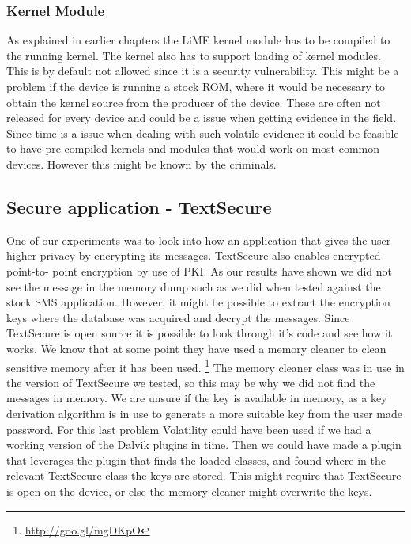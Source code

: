 \subsubsection{Kernel Module}
As explained in earlier chapters the LiME kernel module has to be compiled to the 
running kernel. The kernel also has to support loading of kernel modules. This is 
by default not allowed since it is a security vulnerability. This might be a 
problem if the device is running a stock ROM, where it would be necessary to obtain 
the kernel source from the producer of the device. These are often not released for 
every device and could be a issue when getting evidence in the field. Since time is 
a issue when dealing with such volatile evidence it could be feasible to have 
pre-compiled kernels and modules that would work on most common devices. However 
this might be known by the criminals. %

\subsection{Secure application - TextSecure}
One of our experiments was to look into how an application that gives the user higher 
privacy by encrypting its messages. TextSecure also enables encrypted point-to-
point encryption by use of PKI. As our results have shown we did not see the 
message in the memory dump such as we did when tested against the stock SMS application. 
However, it might be possible to extract the encryption keys where the database was 
acquired and decrypt the messages. Since TextSecure is open source it is
possible to look through it's code and see how it works. We know that at some
point they have used a memory cleaner to clean sensitive memory after it has
been used.
\footnote{\url{http://goo.gl/mgDKpO}} 
The memory cleaner class was in use in the version of TextSecure we tested, so
this may be why we did not find the messages in memory. We are unsure if the
key is available in memory, as a key derivation algorithm is in use to
generate a more suitable key from the user made password. For this last
problem Volatility could have been used if we had a working version of the
Dalvik plugins in time. Then we could have made a plugin that leverages the
plugin that finds the loaded classes, and found where in the relevant
TextSecure class the keys are stored. This might require that TextSecure is
open on the device, or else the memory cleaner might overwrite the keys.

